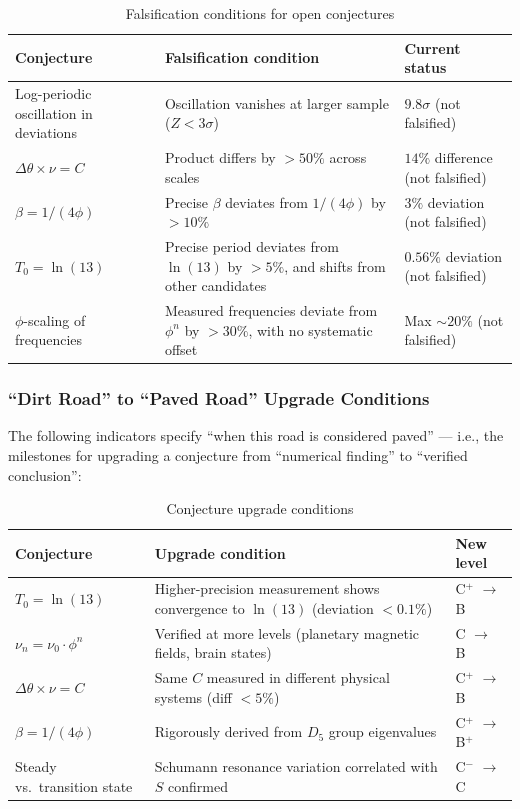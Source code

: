 \begin{table}[htbp]
\centering
\caption{Falsification conditions for open conjectures}
\label{tab:falsifiability_en}
\begin{tabular}{lll}
\hline
Conjecture & Falsification condition & Current status \\
\hline
Log-periodic oscillation in deviations & Oscillation vanishes at larger sample ($Z<3\sigma$) & $9.8\sigma$ (not falsified) \\
$\Delta\theta \times \nu = C$ & Product differs by $>50\%$ across scales & $14\%$ difference (not falsified) \\
$\beta = 1/(4\phi)$ & Precise $\beta$ deviates from $1/(4\phi)$ by $>10\%$ & $3\%$ deviation (not falsified) \\
$T_0 = \ln(13)$ & Precise period deviates from $\ln(13)$ by $>5\%$, and shifts from other candidates & $0.56\%$ deviation (not falsified) \\
$\phi$-scaling of frequencies & Measured frequencies deviate from $\phi^n$ by $>30\%$, with no systematic offset & Max $\sim 20\%$ (not falsified) \\
\hline
\end{tabular}
\end{table}

\subsubsection{``Dirt Road'' to ``Paved Road'' Upgrade Conditions}
\label{subsubsec:upgrade_conditions_en}

The following indicators specify ``when this road is considered paved'' --- i.e., the milestones for upgrading a conjecture from ``numerical finding'' to ``verified conclusion'':

\begin{table}[htbp]
\centering
\caption{Conjecture upgrade conditions}
\label{tab:upgrade_conditions_en}
\begin{tabular}{lll}
\hline
Conjecture & Upgrade condition & New level \\
\hline
$T_0 = \ln(13)$ & Higher-precision measurement shows convergence to $\ln(13)$ (deviation $<0.1\%$) & C$^+$ $\to$ B \\
$\nu_n = \nu_0 \cdot \phi^n$ & Verified at more levels (planetary magnetic fields, brain states) & C $\to$ B \\
$\Delta\theta \times \nu = C$ & Same $C$ measured in different physical systems (diff $<5\%$) & C$^+$ $\to$ B \\
$\beta = 1/(4\phi)$ & Rigorously derived from $D_5$ group eigenvalues & C$^+$ $\to$ B$^+$ \\
Steady vs.\ transition state & Schumann resonance variation correlated with $S$ confirmed & C$^-$ $\to$ C \\
\hline
\end{tabular}
\end{table}

